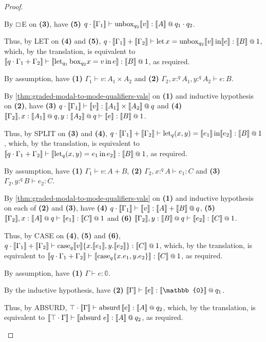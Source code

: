 \documentclass[acmsmall,screen,nonacm]{acmart}
\makeatletter
\DeclareMathOperator{\llet}{\text{let}}
\DeclareMathOperator{\lin}{\text{in}}
\DeclareMathOperator{\case}{\text{case}}
\newcommand{\at}{\mathbin{\mbox{\small\ensuremath{@}}}}
\newcommand{\zero}{\mathbb{0}}
\DeclareMathOperator{\absurd}{\text{absurd}}
\newcommand{\tee}{\vdash}
\newcommand{\sem}[1]{\llbracket #1 \rrbracket}
\makeatother
\begin{document}
\begin{proof}
\begin{description}
    By $\boxempty$E on \textbf{(3)}, have \textbf{(5)} $q \cdot \sem{\Gamma_1}\tee \mathrm{unbox}_{q_2}\sem{v} : \sem{A} \at q_1 \cdot q_2$. 
    
    Thus, by LET on \textbf{(4)} and \textbf{(5)}, $q \cdot \sem{\Gamma_1} + \sem{\Gamma_2} \tee \llet x = \mathrm{unbox}_{q_2}\sem{v} \lin \sem{e} : \sem{B} \at 1$, which, by the translation, is equivalent to $\sem{q \cdot \Gamma_1 + \Gamma_2} \tee \sem{\llet_{q_1} \mathrm{box}_{q_2} x = v \lin e} : \sem{B} \at 1$, as required.
    \\
    \item[Case SPLIT.]
    By assumption, have \textbf{(1)} $\Gamma_1 \tee v : A_1 \times A_2$ and \textbf{(2)} $\Gamma_2, x :^q A_1, y :^q A_2 \tee e : B$. 
    
    By \ref{thm:graded-modal-to-mode-qualifiers-vals} on \textbf{(1)} and inductive hypothesis on \textbf{(2)}, have \textbf{(3)} $q \cdot \sem{\Gamma_1} \tee \sem{v} : \sem{A_1} \times \sem{A_2} \at q$ and \textbf{(4)} $\sem{\Gamma_2}, x : \sem{A_1} \at q, y : \sem{A_2} \at q \tee \sem{e} : \sem{B} \at 1$. 
    
    Thus, by SPLIT on \textbf{(3)} and \textbf{(4)}, $q \cdot \sem{\Gamma_1} + \sem{\Gamma_2} \tee \llet_q(x, y) = \sem{e_1} \lin \sem{e_2} : \sem{B} \at 1$, which, by the translation, is equivalent to $\sem{q \cdot \Gamma_1 + \Gamma_2} \tee \sem{\llet_q(x, y) = e_1 \lin e_2} : \sem{B} \at 1$, as required.
    \\
    \item[Case CASE.]
    By assumption, have \textbf{(1)} $\Gamma_1 \tee v : A + B$, \textbf{(2)} $\Gamma_2, x :^q A \tee e_1 : C$ and \textbf{(3)} $\Gamma_2, y :^q B \tee e_2 : C$. 
    
    By \ref{thm:graded-modal-to-mode-qualifiers-vals} on \textbf{(1)} and inductive hypothesis on each of \textbf{(2)} and \textbf{(3)}, have \textbf{(4)} $q \cdot \sem{\Gamma_1} \tee \sem{v} : \sem{A} + \sem{B} \at q$, \textbf{(5)} $\sem{\Gamma_2}, x : \sem{A} \at q \tee \sem{e_1} : \sem{C} \at 1$ and \textbf{(6)} $\sem{\Gamma_2}, y : \sem{B} \at q \tee \sem{e_2} : \sem{C} \at 1$. 
    
    Thus, by CASE on \textbf{(4)}, \textbf{(5)} and \textbf{(6)}, $q \cdot \sem{\Gamma_1} + \sem{\Gamma_2} \tee \mathrm{case}_q\sem{v}\{x.\sem{e_1}, y.\sem{e_2}\} : \sem{C} \at 1$, which, by the translation, is equivalent to $\sem{q \cdot \Gamma_1 + \Gamma_2} \tee \sem{\case_q\{x.e_1, y.e_2\}} : \sem{C} \at 1$, as required.
    \\
    \item[Case ABSURD.]
    By assumption, have \textbf{(1)} $\Gamma \tee e : \zero$.

    By the inductive hypothesis, have \textbf{(2)} $\sem{\Gamma} \tee \sem{e} : \sem{\zero} \at q_1$.

    Thus, by ABSURD, $\top \cdot \sem{\Gamma} \tee \absurd \, \sem{e} : \sem{A} \at q_2$, which, by the translation, is equivalent to $\sem{\top \cdot \Gamma} \tee \sem{\absurd \, e} : \sem{A} \at q_2$, as required.
  \end{description}
\end{proof}
\end{document}
